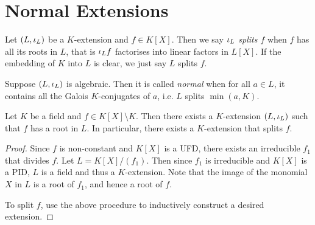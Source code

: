 \documentclass[main.tex]{subfiles}
\begin{document}
\section{Normal Extensions}

\begin{dfn}  
  
  Let $(L,\iota_L)$ be a $K$-extension and $f \in K[X]$. 
  Then we say \emph{$\iota_L$ splits $f$} when 
  $f$ has all its roots in $L$, 
  that is $\iota_L f$ factorises into linear factors in $L[X]$. 
  If the embedding of $K$ into $L$ is clear, 
  we just say $L$ splits $f$. 

  Suppose $(L,\iota_L)$ is algebraic. 
  Then it is called \emph{normal} when for all $a \in L$,  
  it contains all the Galois $K$-conjugates of $a$,
  i.e. $L$ splits $\min(a,K)$. 
\end{dfn}

\begin{thm} 
  
  Let $K$ be a field and $f \in K[X] \setminus K$.
  Then there exists a $K$-extension $(L,\iota_L)$ such that
  $f$ has a root in $L$. 
  In particular, there exists a $K$-extension that splits $f$. 
\end{thm}
\begin{proof}
  Since $f$ is non-constant and $K[X]$ is a UFD, 
  there exists an irreducible $f_1$ that divides $f$.
  Let $L = K[X] / (f_1)$. 
  Then since $f_1$ is irreducible and $K[X]$ is a PID, 
  $L$ is a field and thus a $K$-extension. 
  Note that the image of the monomial $X$ in $L$ is a root of $f_1$,
  and hence a root of $f$.  

  To split $f$, use the above procedure to 
  inductively construct a desired extension.
\end{proof}
\end{document}
